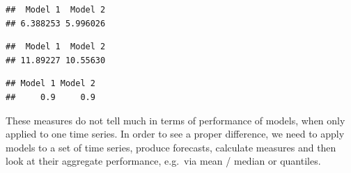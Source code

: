 \documentclass[
]{book}
\newenvironment{Shaded}{\begin{snugshade}}{\end{snugshade}}
\newcommand{\CommentTok}[1]{\textcolor[rgb]{0.56,0.35,0.01}{\textit{#1}}}
\newcommand{\FloatTok}[1]{\textcolor[rgb]{0.00,0.00,0.81}{#1}}
\newcommand{\FunctionTok}[1]{\textcolor[rgb]{0.00,0.00,0.00}{#1}}
\newcommand{\NormalTok}[1]{#1}
\newcommand{\SpecialCharTok}[1]{\textcolor[rgb]{0.00,0.00,0.00}{#1}}
\newcommand{\StringTok}[1]{\textcolor[rgb]{0.31,0.60,0.02}{#1}}
\theoremstyle{definition}
\theoremstyle{definition}
\theoremstyle{definition}
\theoremstyle{definition}
\theoremstyle{remark}
\begin{document}
\begin{verbatim}
##  Model 1  Model 2 
## 6.388253 5.996026
\end{verbatim}

\begin{Shaded}
\end{Shaded}

\begin{verbatim}
##  Model 1  Model 2 
## 11.89227 10.55630
\end{verbatim}

\begin{Shaded}
\end{Shaded}

\begin{verbatim}
## Model 1 Model 2 
##     0.9     0.9
\end{verbatim}

These measures do not tell much in terms of performance of models, when only applied to one time series. In order to see a proper difference, we need to apply models to a set of time series, produce forecasts, calculate measures and then look at their aggregate performance, e.g.~via mean / median or quantiles.
\end{document}
